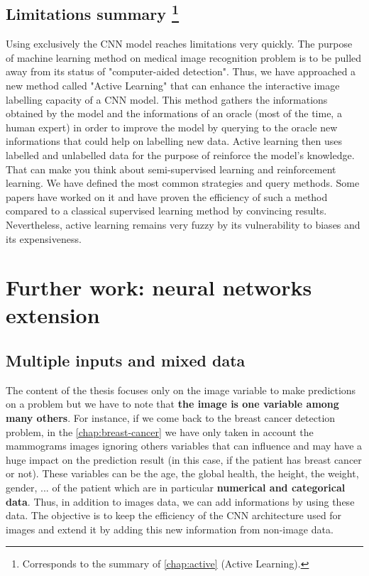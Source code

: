\documentclass[11pt, openany]{report}
\theoremstyle{plain}
\theoremstyle{definition}
\theoremstyle{remark}
\begin{document}
\subsection{Limitations summary \protect\footnote{Corresponds to the summary of \autoref{chap:active} (Active Learning).}}
Using exclusively the CNN model reaches limitations very quickly. The purpose of machine learning method on medical image recognition problem is to be pulled away from its status of "computer-aided detection". Thus, we have approached a new method called "Active Learning" that can enhance the interactive image labelling capacity of a CNN model. This method gathers the informations obtained by the model and the informations of an oracle (most of the time, a human expert) in order to improve the model by querying to the oracle new informations that could help on labelling new data. Active learning then uses labelled and unlabelled data for the purpose of reinforce the model's knowledge. That can make you think about semi-supervised learning and reinforcement learning. We have defined the most common strategies and query methods. Some papers have worked on it and have proven the efficiency of such a method compared to a classical supervised learning method by convincing results. Nevertheless, active learning remains very fuzzy by its vulnerability to biases and its expensiveness. 

\section{Further work: neural networks extension}

\subsection{Multiple inputs and mixed data}
The content of the thesis focuses only on the image variable to make predictions on a problem but we have to note that \textbf{the image is one variable among many others}. For instance, if we come back to the breast cancer detection problem, in the \autoref{chap:breast-cancer} we have only taken in account the mammograms images ignoring others variables that can influence and may have a huge impact on the prediction result (in this case, if the patient has breast cancer or not). These variables can be the age, the global health, the height, the weight, gender, ... of the patient which are in particular \textbf{numerical and categorical data}. Thus, in addition to images data, we can add informations by using these data. The objective is to keep the efficiency of the CNN architecture used for images and extend it by adding this new information from non-image data. 
\end{document}
